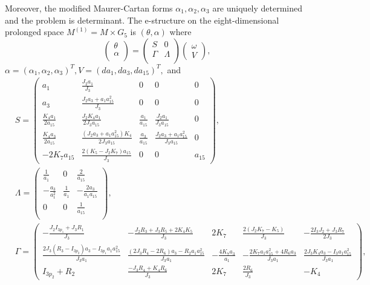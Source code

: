 \documentclass[12pt]{article}
\begin{document}
Moreover, the modified Maurer-Cartan forms $\alpha_1, \alpha_2,\alpha_3$ are uniquely determined and the problem is determinant. The e-structure on the 
eight-dimensional prolonged space $M^{(1)}=M\times G_5$ is $(\theta,\alpha)$ where 
\begin{equation}\label{135}
\begin{pmatrix}
\theta\\
\alpha\\
\end{pmatrix}=
\begin{pmatrix}
S&0\\
\Gamma&\Lambda\\
\end{pmatrix}
\begin{pmatrix}
\omega\\
V
\end{pmatrix},
\end{equation}
$\alpha=(\alpha_1,\alpha_2,\alpha_3)^T, V=(da_1, da_3,da_{15})^T,$ and
\begin{equation}\label{125}
\begin{aligned}
&S=\begin{pmatrix}
a_1&\frac{J_2a_1}{J_3}&0&0&0\\
a_3&\frac{J_2a_3+a_1a_{15}^2}{J_3}&0&0&0\\
\frac{K_4a_1}{2a_{15}}&\frac{J_2K_4a_1}{2J_3a_{15}}&\frac{a_1}{a_{15}}&\frac{J_2a_1}{J_3a_{15}}&0\\
\frac{K_4a_3}{2a_{15}}&\frac{(J_2a_3+a_1a_{15}^2)K_4}{2J_3a_{15}}&\frac{a_3}{a_{15}}&\frac{J_2a_3+a_1a_{15}^2}{J_3a_{15}}&0\\
-2K_7a_{15}&\frac{2(K_5-J_2K_7)a_{15}}{J_3}&0&0&a_{15}
\end{pmatrix},\\
&\Lambda=\begin{pmatrix}
\frac{1}{a_1}&0&\frac{2}{a_{15}}\\
-\frac{a_3}{a_1^2}&\frac{1}{a_1}&-\frac{2a_3}{a_1a_{15}}\\
0&0&\frac{1}{a_{15}}\\
\end{pmatrix},\\
 &\Gamma=\begin{pmatrix}
-\frac{J_2I_{3p_1}+J_3R_1}{J_3}&-\frac{J_2R_3+J_3R_5+2K_4K_5}{J_3}&2K_7&\frac{2(J_2K_7-K_5)}{J_3}&-\frac{2I_3J_2+J_3R_7}{2J_3}\\
\frac{2J_3(R_3-I_{3p_2})a_3-I_{3p_1}a_1a_{15}^2}{J_3a_1}&\frac{(2J_3R_4-2R_6)a_3-R_2a_1a_{15}^2}{J_3a_1}&-\frac{4K_7a_3}{a_1}&-\frac{2K_7a_1a_{15}^2+4R_6a_3}{J_3a_1}&\frac{2J_3K_4a_3-I_3a_1a_{15}^2}{J_3a_1}\\
I_{3p_2}+R_{2}&\frac{-J_3R_4+K_4R_6}{J_3}&2K_7&\frac{2R_6}{J_3}&-K_4
\end{pmatrix},
\end{aligned}
\end{equation}
\end{document}
